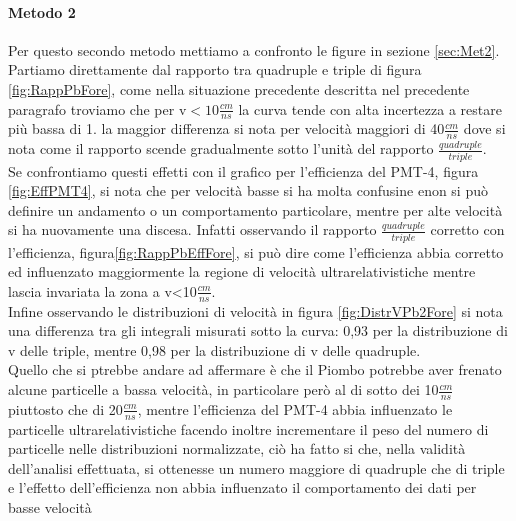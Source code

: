 \documentclass[a4paper]{article}
\begin{document}
\paragraph{Metodo 2}
Per questo secondo metodo mettiamo a confronto le figure in sezione \ref{sec:Met2}.\\
Partiamo direttamente dal rapporto tra quadruple e triple di figura \ref{fig:RappPbFore}, come nella situazione precedente descritta nel precedente paragrafo troviamo che per v$<10\frac{cm}{ns}$ la curva tende con alta incertezza a restare più bassa di 1. la maggior differenza si nota per velocità maggiori di 40$\frac{cm}{ns}$ dove si nota come il rapporto scende gradualmente sotto l'unità del rapporto $\frac{quadruple}{triple}$.\\
Se confrontiamo questi effetti con il grafico per l'efficienza del PMT-4, figura \ref{fig:EffPMT4}, si nota che per velocità basse si ha molta confusine enon si può definire un andamento o un comportamento particolare, mentre per alte velocità si ha nuovamente una discesa. Infatti osservando il rapporto $\frac{quadruple}{triple}$ corretto con l'efficienza, figura\ref{fig:RappPbEffFore}, si può dire come l'efficienza abbia corretto ed influenzato maggiormente la regione di velocità ultrarelativistiche mentre lascia invariata la zona a v<10$\frac{cm}{ns}$.\\
Infine osservando le distribuzioni di velocità in figura \ref{fig:DistrVPb2Fore} si nota una differenza tra gli integrali misurati sotto la curva: 0,93 per la distribuzione di v delle triple, mentre 0,98 per la distribuzione di v delle quadruple.\\
Quello che si ptrebbe andare ad affermare è che il Piombo potrebbe aver frenato alcune particelle a bassa velocità, in particolare però al di sotto dei 10$\frac{cm}{ns}$ piuttosto che di 20$\frac{cm}{ns}$, mentre l'efficienza del PMT-4 abbia influenzato le particelle ultrarelativistiche facendo inoltre incrementare il peso del numero di particelle nelle distribuzioni normalizzate, ciò ha fatto si che, nella validità dell'analisi effettuata, si ottenesse un numero maggiore di quadruple che di triple e l'effetto dell'efficienza non abbia influenzato il comportamento dei dati per basse velocità
\end{document}
